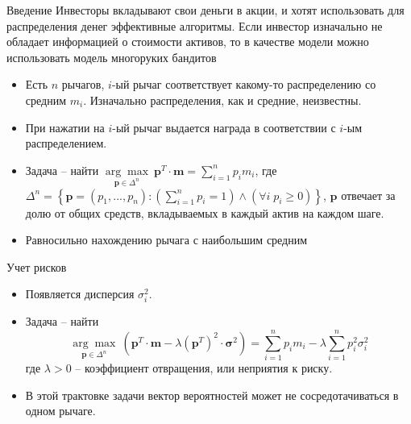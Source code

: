 \documentclass[10pt]{beamer} %
\begin{document}
\setsansfont{Noto Sans} %

\frame{\titlepage} %

\begin{frame}{Введение}
    Инвесторы вкладывают свои деньги в акции, и хотят использовать для распределения денег эффективные алгоритмы. \pause
    Если инвестор изначально не обладает информацией о стоимости активов, то в качестве модели можно использовать модель многоруких бандитов
    \begin{itemize}
        \item<3-> Есть $n$ рычагов, $i$-ый рычаг соответствует какому-то распределению со средним $m_i$. Изначально распределения, как и средние, неизвестны.
        \item<4-> При нажатии на $i$-ый рычаг выдается награда в соответствии с $i$-ым распределением.
        \item<5-> Задача -- найти $\underset{\textbf{p} \in \Delta^n}{\arg \max} \: \textbf{p}^T \cdot \textbf{m} = \sum_{i=1}^n p_i m_i$, где $\Delta^n = \left\{ \textbf{p} = (p_1, ..., p_n) : \left(\sum_{i=1}^n p_i = 1\right) \wedge (\forall i \; p_i \geqslant 0) \right\}$, $\textbf{p}$ отвечает за долю от общих средств, вкладываемых в каждый актив на каждом шаге.
        \item<6-> Равносильно нахождению рычага с наибольшим средним
    \end{itemize}
\end{frame}
\begin{frame}{Учет рисков}
    \begin{itemize}
        \item<1-> Появляется дисперсия $\sigma_i^2$.
        \item<2-> Задача -- найти \[\underset{\textbf{p} \in \Delta^n}{\arg \max} \:
        \left(\textbf{p}^T \cdot \textbf{m} - \lambda \left(\textbf{p}^T\right)^2 \cdot \boldsymbol{\sigma}^2 \right)
        = \sum_{i=1}^n p_i m_i - \lambda \sum_{i=1}^n p_i^2 \sigma_i^2\]
        где $\lambda > 0$ -- коэффициент отвращения, или неприятия к риску.
        \item<3-> В этой трактовке задачи вектор вероятностей может не сосредотачиваться в одном рычаге.
    \end{itemize}
\end{frame}
\end{document}
